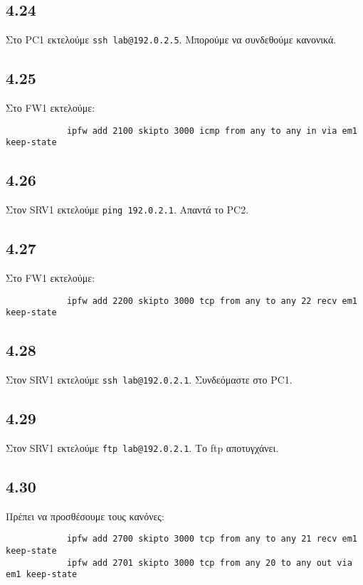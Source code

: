 \documentclass[a4paper, 12pt]{article}
\begin{document}
	\subsection*{4.24}
		Στο PC1 εκτελούμε \verb|ssh lab@192.0.2.5|. Μπορούμε να συνδεθούμε κανονικά.

	\subsection*{4.25}
		Στο FW1 εκτελούμε:
		
		\begin{verbatim}
			ipfw add 2100 skipto 3000 icmp from any to any in via em1 keep-state
		\end{verbatim}

	\subsection*{4.26}
		Στον SRV1 εκτελούμε \verb|ping 192.0.2.1|. Απαντά το PC2.

	\subsection*{4.27}
		Στο FW1 εκτελούμε:
		
		\begin{verbatim}
			ipfw add 2200 skipto 3000 tcp from any to any 22 recv em1 keep-state
		\end{verbatim}

	\subsection*{4.28}
		Στον SRV1 εκτελούμε \verb|ssh lab@192.0.2.1|. Συνδεόμαστε στο PC1.

	\subsection*{4.29}
		Στον SRV1 εκτελούμε \verb|ftp lab@192.0.2.1|. Το ftp αποτυγχάνει.
		
	\subsection*{4.30} 
		Πρέπει να προσθέσουμε τους κανόνες:
		
		\begin{verbatim}
			ipfw add 2700 skipto 3000 tcp from any to any 21 recv em1 keep-state	
			ipfw add 2701 skipto 3000 tcp from any 20 to any out via em1 keep-state
		\end{verbatim}
\end{document}
